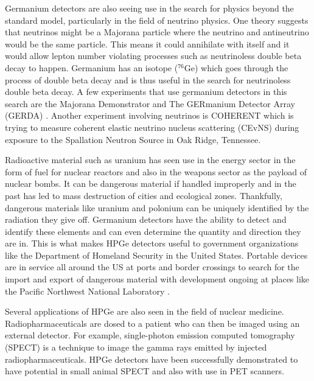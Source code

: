 Germanium detectors are also seeing use in the search for physics beyond the standard model, particularly in the field of neutrino physics.
One theory suggests that neutrinos might be a Majorana particle where the neutrino and antineutrino would be the same particle.
This means it could annihilate with itself and it would allow lepton number violating processes such as neutrinoless double beta decay to happen.
Germanium has an isotope ($^{76}$Ge) which goes through the process of double beta decay and is thus useful in the search for neutrinoless double beta decay.
A few experiments that use germanium detectors in this search are the Majorana Demonstrator \cite{majorana} and The GERmanium Detector Array (GERDA) \cite{gerda}.
Another experiment involving neutrinos is COHERENT \cite{coherent} which is trying to measure coherent elastic neutrino nucleus scattering (CEvNS) during exposure to the Spallation Neutron Source in Oak Ridge, Tennessee.

Radioactive material such as uranium has seen use in the energy sector in the form of fuel for nuclear reactors and also in the weapons sector as the payload of nuclear bombs.
It can be dangerous material if handled improperly and in the past has led to mass destruction of cities and ecological zones.
Thankfully, dangerous materials like uranium and polonium can be uniquely identified by the radiation they give off.
Germanium detectors have the ability to detect and identify these elements and can even determine the quantity and direction they are in.
This is what makes HPGe detectors useful to government organizations like the Department of Homeland Security in the United States.
Portable devices are in service all around the US at ports and border crossings to search for the import and export of dangerous material with development ongoing at places like the Pacific Northwest National Laboratory \cite{StaveHS}.

Several applications of HPGe are also seen in the field of nuclear medicine.
Radiopharmaceuticals are dosed to a patient who can then be imaged using an external detector.
For example, single-photon emission computed tomography (SPECT) is a technique to image the gamma rays emitted by injected radiopharmaceuticals.
HPGe detectors have been successfully demonstrated to have potential in small animal SPECT \cite{SPECT} and also with use in PET scanners.

